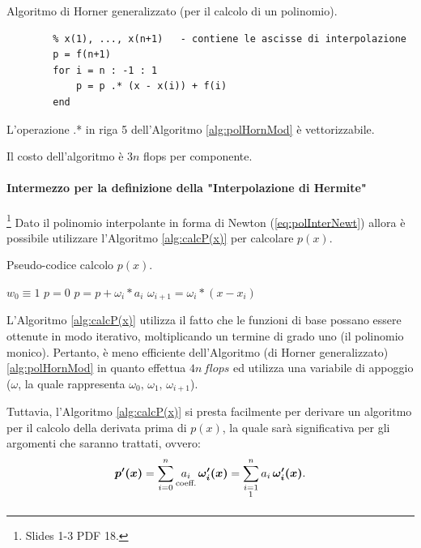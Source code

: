 \begin{algorithm}
\caption{Algoritmo di Horner generalizzato (per il calcolo di un polinomio).}\label{alg:polHornMod}
    \begin{lstlisting}[style=Matlab-editor]
        % f(1), ..., f(n+1)   - calcolato dal codice precedente per le differenze divise
        % x(1), ..., x(n+1)   - contiene le ascisse di interpolazione
        p = f(n+1) 
        for i = n : -1 : 1
            p = p .* (x - x(i)) + f(i)
        end
    \end{lstlisting}
\end{algorithm}

\begin{remark}
    L'operazione .* in riga 5 dell'Algoritmo \ref{alg:polHornMod} è vettorizzabile.
\end{remark}

\begin{remark}
    Il costo dell'algoritmo è $3n$ flops per componente.
\end{remark}

\paragraph{Intermezzo per la definizione della "Interpolazione di Hermite"}\footnote{Slides 1-3 PDF 18.} Dato il polinomio interpolante in forma di Newton (\ref{eq:polInterNewt}) allora è possibile utilizzare l'Algoritmo \ref{alg:calcP(x)} per calcolare $p(x)$.

\begin{algorithm}\caption{Pseudo-codice calcolo $p(x)$.}\label{alg:calcP(x)}
    \begin{algorithmic}
        \State $w_0\equiv 1$
        \State $p = 0$
            \State $p = p + \omega_i * a_i$
            \State $\omega_{i+1} = \omega_i *(x - x_i)$
        \EndFor
    \end{algorithmic}
\end{algorithm}

L'Algoritmo \ref{alg:calcP(x)} utilizza il fatto che le funzioni di base possano essere ottenute in modo iterativo, moltiplicando un termine di grado uno (il polinomio monico). Pertanto, è meno efficiente dell'Algoritmo (di Horner generalizzato) \ref{alg:polHornMod} in quanto effettua $4n\, flops$ ed utilizza una variabile di appoggio ($\omega$, la quale rappresenta $\omega_0,\,\omega_1,\,\omega_{i+1}$).

Tuttavia, l'Algoritmo \ref{alg:calcP(x)} si presta facilmente per derivare un algoritmo per il calcolo della derivata prima di $p(x)$, la quale sarà significativa per gli argomenti che saranno trattati, ovvero:
\begin{equation*}
    \boldsymbol{p'(x)}=\sum_{i=0}^n\underset{\text{coeff.}}{a_i}\,\boldsymbol{\omega'_i(x)}=\sum_{\underset{\footnotemark}{i=1}}^na_i\,\boldsymbol{\omega'_i(x)}.
\end{equation*}

